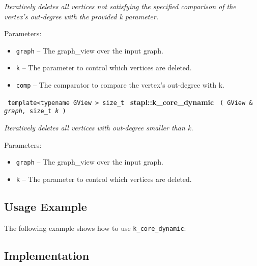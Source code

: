 \textit{
Iteratively deletes all vertices not satisfying the specified comparison of the vertex's out-degree with the provided k parameter.
}
\vspace{0.4cm}

Parameters:
\begin{itemize}
\item
\texttt{graph} --
The graph\_view over the input graph.
\item
\texttt{k} --
The parameter to control which vertices are deleted.
\item
\texttt{comp} --
The comparator to compare the vertex's out-degree with k.
\end{itemize}


\noindent
\texttt{%
template<typename GView >
\newline
size\_t 
}
\textbf{stapl::k\_core\_dynamic}%
\newline
\texttt{%
(
GView \&
\textit{graph,}%
size\_t
\textit{k}%
)     
}
\vspace{0.4cm}

\textit{
Iteratively deletes all vertices with out-degree smaller than k.
}
\vspace{0.4cm}

Parameters:
\begin{itemize}
\item
\texttt{graph} --
The graph\_view over the input graph.
\item
\texttt{k} --
The parameter to control which vertices are deleted.
\end{itemize}

\subsection{Usage Example} \label{sec-k-core-dyn-alg-use}

The following example shows how to use 
\texttt{k\_core\_dynamic}:


\subsection{Implementation} \label{sec-k-core-dyn-alg-impl}

